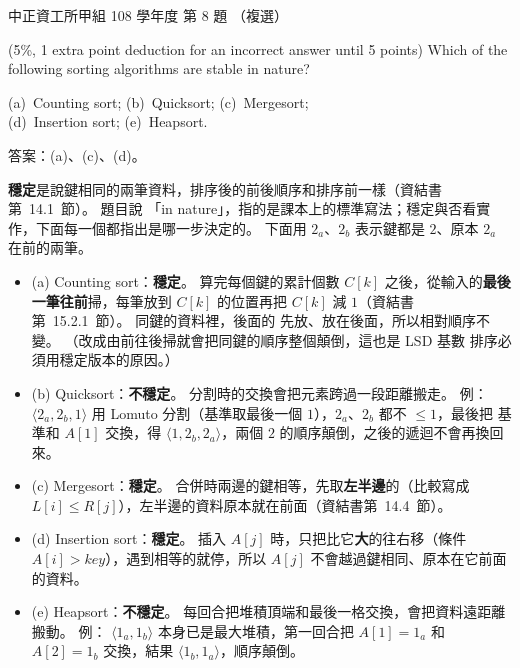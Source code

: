 \begin{pastexam}[label={px:ccu-108-swa-07}]{中正資工所甲組 108 學年度 第 8 題}
（複選）

(5\%, 1 extra point deduction for an incorrect answer until 5 points) Which of the following
sorting algorithms are stable in nature?

(a)~Counting sort; \qquad (b)~Quicksort; \qquad (c)~Mergesort;\\
(d)~Insertion sort; \qquad (e)~Heapsort.
\end{pastexam}

\begin{pastsoln}
答案：(a)、(c)、(d)。

\textbf{穩定}是說鍵相同的兩筆資料，排序後的前後順序和排序前一樣（資結書第~14.1~節）。 題目說
「in nature」，指的是課本上的標準寫法；穩定與否看實作，下面每一個都指出是哪一步決定的。 下面用
$2_a$、$2_b$ 表示鍵都是 $2$、原本 $2_a$ 在前的兩筆。

\begin{itemize}
\item (a) Counting sort：\textbf{穩定}。 算完每個鍵的累計個數 $C[k]$ 之後，從輸入的\textbf{最後
一筆往前}掃，每筆放到 $C[k]$ 的位置再把 $C[k]$ 減 $1$（資結書第~15.2.1~節）。 同鍵的資料裡，後面的
先放、放在後面，所以相對順序不變。 （改成由前往後掃就會把同鍵的順序整個顛倒，這也是 LSD 基數
排序必須用穩定版本的原因。）
\item (b) Quicksort：\textbf{不穩定}。 分割時的交換會把元素跨過一段距離搬走。 例：
$\langle 2_a, 2_b, 1\rangle$ 用 Lomuto 分割（基準取最後一個 $1$），$2_a$、$2_b$ 都不 $\le 1$，最後把
基準和 $A[1]$ 交換，得 $\langle 1, 2_b, 2_a\rangle$，兩個 $2$ 的順序顛倒，之後的遞迴不會再換回來。
\item (c) Mergesort：\textbf{穩定}。 合併時兩邊的鍵相等，先取\textbf{左半邊}的（比較寫成 $L[i] \le
R[j]$），左半邊的資料原本就在前面（資結書第~14.4~節）。
\item (d) Insertion sort：\textbf{穩定}。 插入 $A[j]$ 時，只把比它\textbf{大}的往右移（條件
$A[i] > \mathit{key}$），遇到相等的就停，所以 $A[j]$ 不會越過鍵相同、原本在它前面的資料。
\item (e) Heapsort：\textbf{不穩定}。 每回合把堆積頂端和最後一格交換，會把資料遠距離搬動。 例：
$\langle 1_a, 1_b\rangle$ 本身已是最大堆積，第一回合把 $A[1] = 1_a$ 和 $A[2] = 1_b$ 交換，結果
$\langle 1_b, 1_a\rangle$，順序顛倒。
\end{itemize}
\end{pastsoln}
